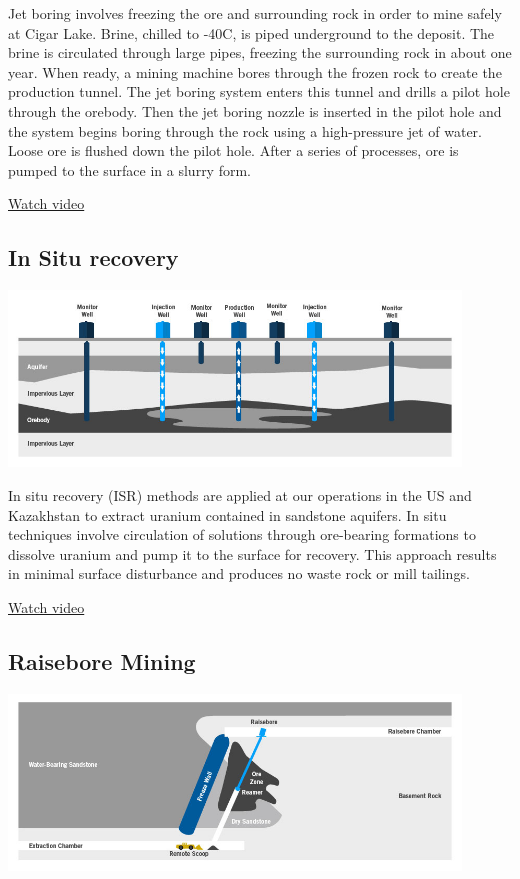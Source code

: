 Jet boring involves freezing the ore and surrounding rock in order to mine safely at Cigar Lake. Brine, chilled to -40C, is piped underground to the deposit. The brine is circulated through large pipes, freezing the surrounding rock in about one year. When ready, a mining machine bores through the frozen rock to create the production tunnel. The jet boring system enters this tunnel and drills a pilot hole through the orebody. Then the jet boring nozzle is inserted in the pilot hole and the system begins boring through the rock using a high-pressure jet of water. Loose ore is flushed down the pilot hole. After a series of processes, ore is pumped to the surface in a slurry form.

\href{https://www.cameco.com/businesses/mining-methods/jet-boring-video}{Watch video}
\subsection*{In Situ recovery}
\label{ssec_insitu}
\includegraphics[width=0.9\textwidth]{img/cameco/3.0.1-3MiningMethods-ISR.jpg}

In situ recovery (ISR) methods are applied at our operations in the US and Kazakhstan to extract uranium contained in sandstone aquifers. In situ techniques involve circulation of solutions through ore-bearing formations to dissolve uranium and pump it to the surface for recovery. This approach results in minimal surface disturbance and produces no waste rock or mill tailings.

\href{https://www.cameco.com/businesses/mining-methods/in-situ-recovery-video}{Watch video}
\subsection*{Raisebore Mining}
\label{ssec_raisebore}
\includegraphics[width=0.9\textwidth]{img/cameco/3.0.1-4MiningMethods-Raisebore.jpg}


